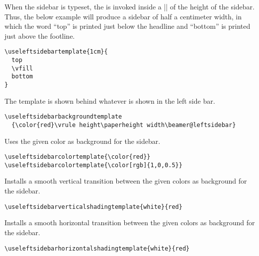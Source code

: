 \begin{command}{\useleftsidebartemplate{}}
  When the sidebar is typeset, the  is invoked inside a
  |\vbox| of the height of the sidebar. Thus, the below example
  will produce a sidebar of half a centimeter width, in which the word
  ``top'' is printed just below the headline and ``bottom'' is printed
  just above the footline.
  \example
\begin{verbatim}
\useleftsidebartemplate{1cm}{
  top
  \vfill
  bottom
}
\end{verbatim}
\end{command}

\begin{command}{\useleftsidebarbackgroundtemplate{}}
  The template is shown behind whatever is shown in the left side
  bar. 
  \example
\begin{verbatim}
\useleftsidebarbackgroundtemplate
  {\color{red}\vrule height\paperheight width\beamer@leftsidebar}
\end{verbatim}
\end{command}


\begin{command}{\useleftsidebarcolortemplate{}}
  Uses the given color as background for the sidebar.
  \example
\begin{verbatim}
\useleftsidebarcolortemplate{\color{red}}
\useleftsidebarcolortemplate{\color[rgb]{1,0,0.5}}
\end{verbatim}
\end{command}

\begin{command}{\useleftsidebarverticalshadingtemplate{}}
  Installs a smooth vertical transition between the given colors as
  background for the sidebar.
  \example
\begin{verbatim}
\useleftsidebarverticalshadingtemplate{white}{red}
\end{verbatim}
\end{command}


\begin{command}{\useleftsidebarhorizontalshadingtemplate{}}
  Installs a smooth horizontal transition between the given colors as
  background for the sidebar.
  \example
\begin{verbatim}
\useleftsidebarhorizontalshadingtemplate{white}{red}
\end{verbatim}
\end{command}


